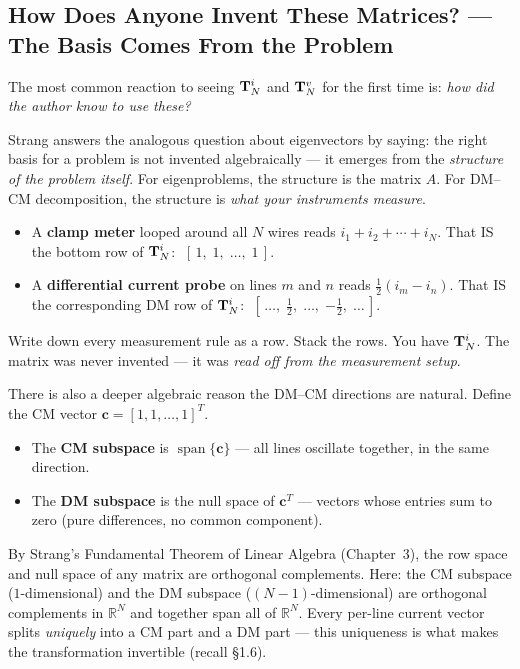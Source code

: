 \subsection{How Does Anyone Invent These Matrices? — The Basis Comes From the Problem}

The most common reaction to seeing $\mathbf{T}^{i}_{N}$ and $\mathbf{T}^{v}_{N}$ for the first
time is: \emph{how did the author know to use these?}

Strang answers the analogous question about eigenvectors by saying:
the right basis for a problem is not invented algebraically — it
emerges from the \emph{structure of the problem itself}.  For
eigenproblems, the structure is the matrix $A$.  For DM--CM
decomposition, the structure is \emph{what your instruments measure}.

\begin{physbox}
\begin{itemize}
    \item A \textbf{clamp meter} looped around all $N$ wires reads
          $i_1 + i_2 + \cdots + i_N$.  That IS the bottom row of
          $\mathbf{T}^{i}_{N}$: $\;[\,1,\;1,\;\ldots,\;1\,]$.

    \item A \textbf{differential current probe} on lines $m$ and $n$
          reads $\tfrac{1}{2}(i_m - i_n)$.  That IS the corresponding
          DM row of $\mathbf{T}^{i}_{N}$: $\;[\,\ldots,\;\tfrac{1}{2},\;\ldots,\;
          {-\tfrac{1}{2}},\;\ldots\,]$.
\end{itemize}
Write down every measurement rule as a row.  Stack the rows.  You
have $\mathbf{T}^{i}_{N}$.  The matrix was never invented — it was \emph{read off
from the measurement setup}.
\end{physbox}

There is also a deeper algebraic reason the DM--CM directions are
natural.  Define the CM vector $\mathbf{c} = [1, 1, \ldots, 1]^T$.
\begin{itemize}
    \item The \textbf{CM subspace} is $\operatorname{span}\{\mathbf{c}\}$
          — all lines oscillate together, in the same direction.
    \item The \textbf{DM subspace} is the null space of $\mathbf{c}^T$
          — vectors whose entries sum to zero (pure differences, no
          common component).
\end{itemize}
By Strang's Fundamental Theorem of Linear Algebra (Chapter~3), the
row space and null space of any matrix are orthogonal complements.
Here: the CM subspace ($1$-dimensional) and the DM subspace
($(N{-}1)$-dimensional) are orthogonal complements in $\mathbb{R}^N$
and together span all of $\mathbb{R}^N$.  Every per-line current
vector splits \emph{uniquely} into a CM part and a DM part — this
uniqueness is what makes the transformation invertible (recall \S1.6).


